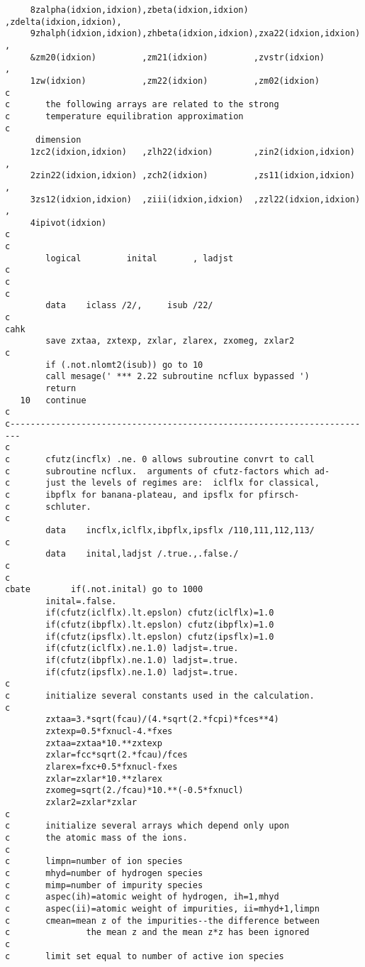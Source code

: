\begin{verbatim}
     8zalpha(idxion,idxion),zbeta(idxion,idxion) ,zdelta(idxion,idxion),
     9zhalph(idxion,idxion),zhbeta(idxion,idxion),zxa22(idxion,idxion) ,
     &zm20(idxion)         ,zm21(idxion)         ,zvstr(idxion)        ,
     1zw(idxion)           ,zm22(idxion)         ,zm02(idxion)
c
c       the following arrays are related to the strong
c       temperature equilibration approximation
c
      dimension
     1zc2(idxion,idxion)   ,zlh22(idxion)        ,zin2(idxion,idxion)  ,
     2zin22(idxion,idxion) ,zch2(idxion)         ,zs11(idxion,idxion)  ,
     3zs12(idxion,idxion)  ,ziii(idxion,idxion)  ,zzl22(idxion,idxion) ,
     4ipivot(idxion)
c
c
        logical         inital       , ladjst
c
c
c
        data    iclass /2/,     isub /22/
c
cahk
        save zxtaa, zxtexp, zxlar, zlarex, zxomeg, zxlar2
c
        if (.not.nlomt2(isub)) go to 10
        call mesage(' *** 2.22 subroutine ncflux bypassed ')
        return
   10   continue
c
c------------------------------------------------------------------------
c
c       cfutz(incflx) .ne. 0 allows subroutine convrt to call
c       subroutine ncflux.  arguments of cfutz-factors which ad-
c       just the levels of regimes are:  iclflx for classical,
c       ibpflx for banana-plateau, and ipsflx for pfirsch-
c       schluter.
c
        data    incflx,iclflx,ibpflx,ipsflx /110,111,112,113/
c
        data    inital,ladjst /.true.,.false./
c
c
cbate        if(.not.inital) go to 1000
        inital=.false.
        if(cfutz(iclflx).lt.epslon) cfutz(iclflx)=1.0
        if(cfutz(ibpflx).lt.epslon) cfutz(ibpflx)=1.0
        if(cfutz(ipsflx).lt.epslon) cfutz(ipsflx)=1.0
        if(cfutz(iclflx).ne.1.0) ladjst=.true.
        if(cfutz(ibpflx).ne.1.0) ladjst=.true.
        if(cfutz(ipsflx).ne.1.0) ladjst=.true.
c
c       initialize several constants used in the calculation.
c
        zxtaa=3.*sqrt(fcau)/(4.*sqrt(2.*fcpi)*fces**4)
        zxtexp=0.5*fxnucl-4.*fxes
        zxtaa=zxtaa*10.**zxtexp
        zxlar=fcc*sqrt(2.*fcau)/fces
        zlarex=fxc+0.5*fxnucl-fxes
        zxlar=zxlar*10.**zlarex
        zxomeg=sqrt(2./fcau)*10.**(-0.5*fxnucl)
        zxlar2=zxlar*zxlar
c
c       initialize several arrays which depend only upon
c       the atomic mass of the ions.
c
c       limpn=number of ion species
c       mhyd=number of hydrogen species
c       mimp=number of impurity species
c       aspec(ih)=atomic weight of hydrogen, ih=1,mhyd
c       aspec(ii)=atomic weight of impurities, ii=mhyd+1,limpn
c       cmean=mean z of the impurities--the difference between
c               the mean z and the mean z*z has been ignored
c
c       limit set equal to number of active ion species

\end{verbatim}
